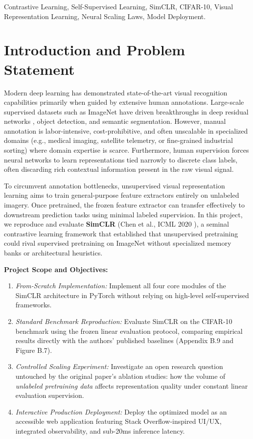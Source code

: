 \documentclass[conference]{IEEEtran}
\begin{document}
\begin{IEEEkeywords}
Contrastive Learning, Self-Supervised Learning, SimCLR, CIFAR-10, Visual Representation Learning, Neural Scaling Laws, Model Deployment.
\end{IEEEkeywords}

\section{Introduction and Problem Statement}
Modern deep learning has demonstrated state-of-the-art visual recognition capabilities primarily when guided by extensive human annotations. Large-scale supervised datasets such as ImageNet \cite{russakovsky2015imagenet} have driven breakthroughs in deep residual networks \cite{he2016deep}, object detection, and semantic segmentation. However, manual annotation is labor-intensive, cost-prohibitive, and often unscalable in specialized domains (e.g., medical imaging, satellite telemetry, or fine-grained industrial sorting) where domain expertise is scarce. Furthermore, human supervision forces neural networks to learn representations tied narrowly to discrete class labels, often discarding rich contextual information present in the raw visual signal.

To circumvent annotation bottlenecks, unsupervised visual representation learning aims to train general-purpose feature extractors entirely on unlabeled imagery. Once pretrained, the frozen feature extractor can transfer effectively to downstream prediction tasks using minimal labeled supervision. In this project, we reproduce and evaluate \textbf{SimCLR} (Chen et al., ICML 2020 \cite{chen2020simple}), a seminal contrastive learning framework that established that unsupervised pretraining could rival supervised pretraining on ImageNet without specialized memory banks or architectural heuristics.

\textbf{Project Scope and Objectives:}
\begin{enumerate}
    \item \textit{From-Scratch Implementation:} Implement all four core modules of the SimCLR architecture in PyTorch without relying on high-level self-supervised frameworks.
    \item \textit{Standard Benchmark Reproduction:} Evaluate SimCLR on the CIFAR-10 benchmark \cite{krizhevsky2009learning} using the frozen linear evaluation protocol, comparing empirical results directly with the authors' published baselines (Appendix B.9 and Figure B.7).
    \item \textit{Controlled Scaling Experiment:} Investigate an open research question untouched by the original paper's ablation studies: how the volume of \textit{unlabeled pretraining data} affects representation quality under constant linear evaluation supervision.
    \item \textit{Interactive Production Deployment:} Deploy the optimized model as an accessible web application featuring Stack Overflow-inspired UI/UX, integrated observability, and sub-20ms inference latency.
\end{enumerate}
\end{document}
